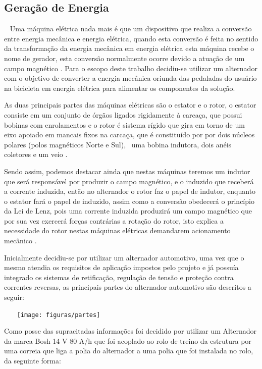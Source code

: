 \subsection{Geração de Energia }  
Uma máquina elétrica nada mais é que um dispositivo que realiza a conversão entre energia mecânica e energia elétrica, quando esta conversão é feita no sentido da transformação da energia mecânica em energia elétrica esta máquina recebe o nome de gerador, esta conversão normalmente ocorre devido a atuação de um campo magnético \cite{chapp2000}.
Para o escopo deste trabalho decidiu-se utilizar um alternador com o objetivo de converter a energia mecânica oriunda das pedaladas do usuário na bicicleta em energia elétrica para alimentar os componentes da solução.

As duas principais partes das máquinas elétricas são o estator e o rotor, o estator consiste em um conjunto de órgãos ligados rigidamente à carcaça, que possui bobinas com enrolamentos e o rotor é sistema rígido que gira em torno de um eixo apoiado em mancais fixos na carcaça, que é constituído por por dois núcleos polares (polos magnéticos Norte e Sul),  uma bobina indutora, dois anéis coletores e um veio \cite{neto2000}.

Sendo assim, podemos destacar ainda que nestas máquinas teremos um indutor que será responsável por produzir o campo magnético, e o induzido que receberá a corrente induzida, então no alternador o rotor faz o papel de indutor, enquanto o estator fará o papel de induzido, assim como a conversão obedecerá o princípio da Lei de Lenz, pois uma corrente induzida produzirá um campo magnético que por sua vez exercerá forças contrárias a rotação do rotor, isto explica a necessidade do rotor nestas máquinas elétricas demandarem acionamento mecânico \cite{neto2000}.

Inicialmente decidiu-se por utilizar um alternador automotivo, uma vez que o mesmo atendia os requisitos de aplicação impostos pelo projeto e já possuía integrado os sistemas de retificação, regulação de tensão e proteção contra correntes reversas, as principais partes do alternador automotivo são descritos a seguir:

\begin{center}
    \texttt{[image: figuras/partes]}
       \label{partes}
   \end{center}

Como posse das supracitadas informações foi decidido por utilizar um Alternador da marca Bosh 14 V 80 A/h que foi acoplado ao rolo de treino da estrutura por uma correia que liga a polia do alternador a uma polia que foi instalada no rolo, da seguinte forma:


